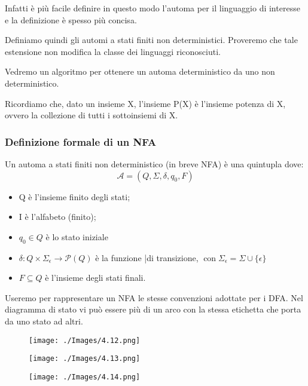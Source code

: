 Infatti è più facile definire in questo modo l'automa per il
linguaggio di interesse e la definizione è spesso più concisa.

Definiamo quindi gli automi a stati finiti non deterministici.
Proveremo che tale estensione non modifica la classe dei linguaggi
riconosciuti.

Vedremo un algoritmo per ottenere un automa deterministico da
uno non deterministico.

Ricordiamo che, dato un insieme X, l'insieme P(X) è l'insieme
potenza di X, ovvero la collezione di tutti i sottoinsiemi di X.

\subsubsection{Definizione formale di un NFA}

Un automa a stati finiti non deterministico (in breve NFA) è una quintupla dove:
$$
\mathcal{A}=\left(Q, \Sigma, \delta, q_{0}, F\right)
$$
\begin{itemize}
    \item  Q è l'insieme finito degli stati;
    \item I è l'alfabeto (finito);
    \item $q_{0} \in Q$ è lo stato iniziale
    \item $\delta: Q \times \Sigma_{\epsilon} \rightarrow \mathcal{P}(Q)$ è la funzione |di transizione, $\operatorname{con} \Sigma_{\epsilon}=\Sigma \cup\{\epsilon\}$
    \item $F \subseteq Q$ è l'insieme degli stati finali.
\end{itemize}
Useremo per rappresentare un NFA le stesse convenzioni adottate
per i DFA.
Nel diagramma di stato vi può essere più di un arco con la stessa
etichetta che porta da uno stato ad altri.

\begin{figure}[hbpt!]
    \centering
    \texttt{[image: ./Images/4.12.png]}
\end{figure}
\FloatBarrier

\begin{figure}[hbpt!]
    \centering
    \texttt{[image: ./Images/4.13.png]}
\end{figure}
\FloatBarrier

\begin{figure}[hbpt!]
    \centering
    \texttt{[image: ./Images/4.14.png]}
\end{figure}
\FloatBarrier

